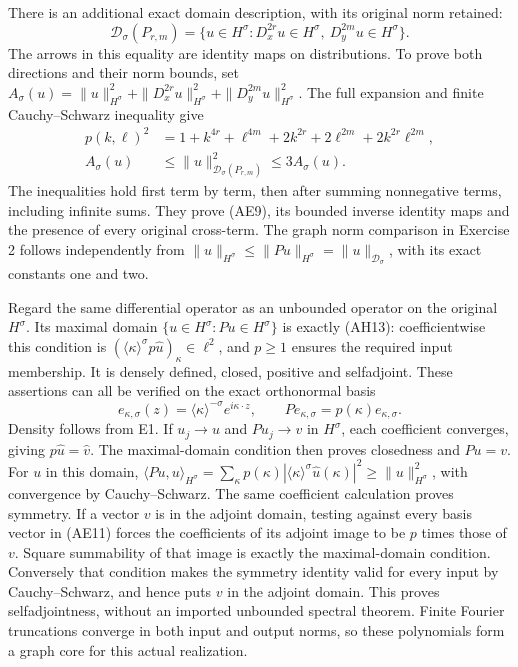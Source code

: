 \documentclass[
  11pt,
]{article}
\begin{document}
There is an additional exact domain description, with its original norm
retained: \[
 \mathcal D_\sigma(P_{r,m})
 =\{u\in H^\sigma:D_x^{2r}u\in H^\sigma,
                         \ D_y^{2m}u\in H^\sigma\}.
 \tag{AE9}
\] The arrows in this equality are identity maps on distributions. To
prove both directions and their norm bounds, set
\(A_\sigma(u)=\|u\|_{H^\sigma}^2+
\|D_x^{2r}u\|_{H^\sigma}^2+\|D_y^{2m}u\|_{H^\sigma}^2\). The full
expansion and finite Cauchy--Schwarz inequality give \[
 \begin{split}
 p(k,\ell)^2
  &=1+k^{4r}+\ell^{4m}+2k^{2r}+2\ell^{2m}
                                         +2k^{2r}\ell^{2m},\\
 A_\sigma(u)&\leq\|u\|_{\mathcal D_\sigma(P_{r,m})}^2
                                      \leq3A_\sigma(u).
 \end{split}
 \tag{AE10}
\] The inequalities hold first term by term, then after summing
nonnegative terms, including infinite sums. They prove (AE9), its
bounded inverse identity maps and the presence of every original
cross-term. The graph norm comparison in Exercise 2 follows
independently from \(\|u\|_{H^\sigma}\leq\|Pu\|_{H^\sigma}
=\|u\|_{\mathcal D_\sigma}\), with its exact constants one and two.

Regard the same differential operator as an unbounded operator on the
original \(H^\sigma\). Its maximal domain
\(\{u\in H^\sigma:Pu\in H^\sigma\}\) is exactly (AH13): coefficientwise
this condition is
\((\langle\kappa\rangle^\sigma p\widehat u)_\kappa\in\ell^2\), and
\(p\geq1\) ensures the required input membership. It is densely defined,
closed, positive and selfadjoint. These assertions can all be verified
on the exact orthonormal basis \[
 e_{\kappa,\sigma}(z)=\langle\kappa\rangle^{-\sigma}
                                      e^{i\kappa\cdot z},
 \qquad P e_{\kappa,\sigma}=p(\kappa)e_{\kappa,\sigma}.
 \tag{AE11}
\] Density follows from E1. If \(u_j\to u\) and \(Pu_j\to v\) in
\(H^\sigma\), each coefficient converges, giving
\(p\widehat u=\widehat v\). The maximal-domain condition then proves
closedness and \(Pu=v\). For \(u\) in this domain,
\(\langle Pu,u\rangle_{H^\sigma}
=\sum_\kappa p(\kappa)|\langle\kappa\rangle^\sigma
\widehat u(\kappa)|^2\geq\|u\|_{H^\sigma}^2\), with convergence by
Cauchy--Schwarz. The same coefficient calculation proves symmetry. If a
vector \(v\) is in the adjoint domain, testing against every basis
vector in (AE11) forces the coefficients of its adjoint image to be
\(p\) times those of \(v\). Square summability of that image is exactly
the maximal-domain condition. Conversely that condition makes the
symmetry identity valid for every input by Cauchy--Schwarz, and hence
puts \(v\) in the adjoint domain. This proves selfadjointness, without
an imported unbounded spectral theorem. Finite Fourier truncations
converge in both input and output norms, so these polynomials form a
graph core for this actual realization.
\end{document}
